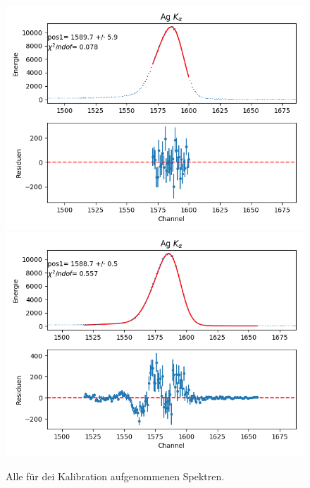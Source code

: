 \documentclass[12pt,a4paper]{article}
\begin{document}
\begin{figure}[H]
\centering
\includegraphics[scale=0.8]{Bilder/alpha/ag_alpha_1.png}
\includegraphics[scale=0.8]{Bilder/alpha/ag_alpha_2.png}
\caption{Alle für dei Kalibration aufgenommenen Spektren.}
\label{fig:kal_alles}
\end{figure}
\end{document}
